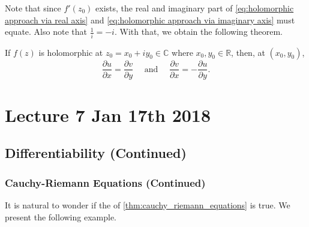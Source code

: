 \documentclass[notoc,notitlepage]{tufte-book}
\begin{document}
Note that since $f'(z_0)$ exists, the real and imaginary part of \cref{eq:holomorphic approach via real axis} and \cref{eq:holomorphic approach via imaginary axis} must equate. Also note that $\frac{1}{i} = -i$. With that, we obtain the following theorem.

\begin{thm}\label{thm:cauchy_riemann_equations}
	If $f(z)$ is holomorphic at $z_0 = x_0 + iy_0 \in \mathbb{C}$ where $x_0, y_0 \in \mathbb{R}$, then, at $(x_0, y_0)$,
	\begin{equation}\label{eq:cauchy_riemann_equations}
		\frac{\partial u}{\partial x} = \frac{\partial v}{\partial y} \quad \text{ and } \quad \frac{\partial v}{\partial x} = - \frac{\partial u}{\partial y}.
	\end{equation}
\end{thm}



\chapter{Lecture 7 Jan 17th 2018}
	\label{chapter:lecture_7_jan_17th_2018}

\section{Differentiability (Continued)} %
\label{sec:differentiability_continued}

\subsection{Cauchy-Riemann Equations (Continued)} %
\label{sub:cauchy_riemann_equations_continued}

It is natural to wonder if the  of \cref{thm:cauchy_riemann_equations} is true. We present the following example.
\end{document}
